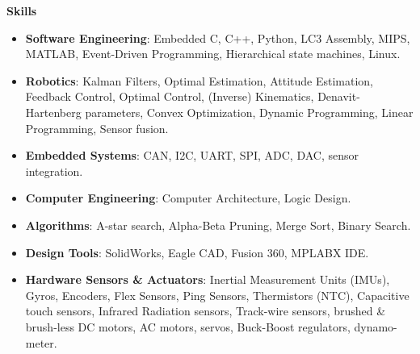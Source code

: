 \documentclass[paper=a4,fontsize=11pt]{article} %
\def \sectionSpace      {0.3cm}     %
\def \subSectionSpace   {0.25cm}    %
\def \leftColSpace      {0.1}       %
\def \bigMiddleColSpace {0.8}       %
\begin{document}
    \noindent
    \begin{minipage}[t]{\leftColSpace\linewidth}
    \noindent \textbf{Skills}\\
    \end{minipage}
    \begin{minipage}[t]{\bigMiddleColSpace\linewidth}
        \begin{itemize}[noitemsep,topsep=0pt]
            \item \noindent \textbf{Software Engineering}: Embedded C, C++, Python, LC3 Assembly, MIPS, MATLAB, Event-Driven Programming, Hierarchical state machines, Linux.
            
            \vspace{\subSectionSpace}
            \item \noindent \textbf{Robotics}: Kalman Filters, Optimal Estimation, Attitude Estimation, Feedback Control, Optimal Control, (Inverse) Kinematics, Denavit-Hartenberg parameters, Convex Optimization, Dynamic Programming, Linear Programming, Sensor fusion.
            
            \vspace{\subSectionSpace}
            \item \noindent \textbf{Embedded Systems}: CAN, I2C, UART, SPI, ADC, DAC, sensor integration.
            
            \vspace{\subSectionSpace}
            \item \noindent \textbf{Computer Engineering}: Computer Architecture, Logic Design.
            
            \vspace{\subSectionSpace}
            \item \noindent \textbf{Algorithms}: A-star search, Alpha-Beta Pruning, Merge Sort, Binary Search.
            
            \vspace{\subSectionSpace}
            \item \noindent \textbf{Design Tools}: SolidWorks, Eagle CAD, Fusion 360, MPLABX IDE.
            
            \vspace{\subSectionSpace}
            \item \noindent \textbf{Hardware Sensors \& Actuators}: Inertial Measurement Units (IMUs), Gyros, Encoders, Flex Sensors, Ping Sensors, Thermistors (NTC), Capacitive touch sensors, Infrared Radiation sensors, Track-wire sensors, brushed \& brush-less DC motors, AC motors, servos, Buck-Boost regulators, dynamo-meter.
        \end{itemize}
    \end{minipage}
\end{document}
